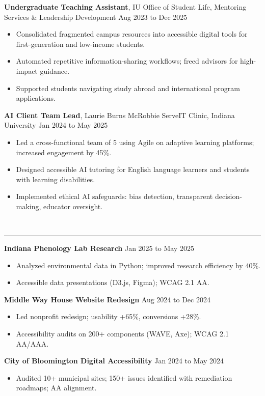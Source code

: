 \documentclass[11pt]{article}
\newcommand{\ressection}[1]{%
  \vspace{0.55em}%
  \noindent{\large\bfseries #1}\\[-0.15em]%
  \noindent\rule{\linewidth}{0.4pt}%
  \vspace{0.3em}%
}
\begin{document}
\noindent\textbf{Undergraduate Teaching Assistant}, IU Office of Student Life, Mentoring Services \& Leadership Development \hfill Aug 2023 to Dec 2025
\begin{itemize}
    \item Consolidated fragmented campus resources into accessible digital tools for first-generation and low-income students.
    \item Automated repetitive information-sharing workflows; freed advisors for high-impact guidance.
    \item Supported students navigating study abroad and international program applications.
\end{itemize}

\noindent\textbf{AI Client Team Lead}, Laurie Burns McRobbie ServeIT Clinic, Indiana University \hfill Jan 2024 to May 2025
\begin{itemize}
    \item Led a cross-functional team of 5 using Agile on adaptive learning platforms; increased engagement by 45\%.
    \item Designed accessible AI tutoring for English language learners and students with learning disabilities.
    \item Implemented ethical AI safeguards: bias detection, transparent decision-making, educator oversight.
\end{itemize}

\ressection{Key projects}
\noindent\textbf{Indiana Phenology Lab Research} \hfill Jan 2025 to May 2025
\begin{itemize}
    \item Analyzed environmental data in Python; improved research efficiency by 40\%.
    \item Accessible data presentations (D3.js, Figma); WCAG 2.1 AA.
\end{itemize}

\noindent\textbf{Middle Way House Website Redesign} \hfill Aug 2024 to Dec 2024
\begin{itemize}
    \item Led nonprofit redesign; usability +65\%, conversions +28\%.
    \item Accessibility audits on 200+ components (WAVE, Axe); WCAG 2.1 AA/AAA.
\end{itemize}

\noindent\textbf{City of Bloomington Digital Accessibility} \hfill Jan 2024 to May 2024
\begin{itemize}
    \item Audited 10+ municipal sites; 150+ issues identified with remediation roadmaps; AA alignment.
\end{itemize}
\end{document}
